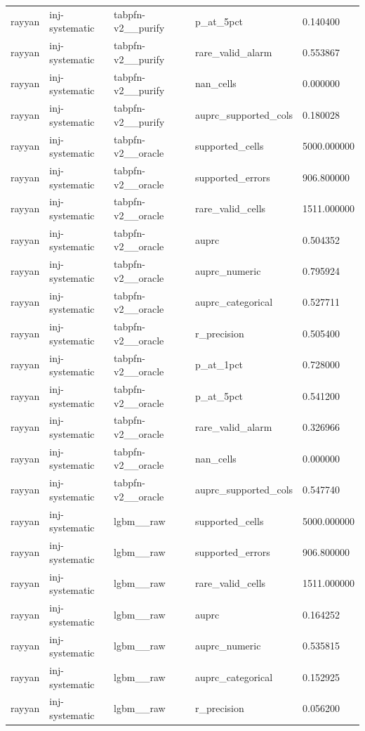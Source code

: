 \begin{tabular}{lllll}
rayyan & inj-systematic & tabpfn-v2\_\_purify & p\_at\_5pct & 0.140400 \\
rayyan & inj-systematic & tabpfn-v2\_\_purify & rare\_valid\_alarm & 0.553867 \\
rayyan & inj-systematic & tabpfn-v2\_\_purify & nan\_cells & 0.000000 \\
rayyan & inj-systematic & tabpfn-v2\_\_purify & auprc\_supported\_cols & 0.180028 \\
rayyan & inj-systematic & tabpfn-v2\_\_oracle & supported\_cells & 5000.000000 \\
rayyan & inj-systematic & tabpfn-v2\_\_oracle & supported\_errors & 906.800000 \\
rayyan & inj-systematic & tabpfn-v2\_\_oracle & rare\_valid\_cells & 1511.000000 \\
rayyan & inj-systematic & tabpfn-v2\_\_oracle & auprc & 0.504352 \\
rayyan & inj-systematic & tabpfn-v2\_\_oracle & auprc\_numeric & 0.795924 \\
rayyan & inj-systematic & tabpfn-v2\_\_oracle & auprc\_categorical & 0.527711 \\
rayyan & inj-systematic & tabpfn-v2\_\_oracle & r\_precision & 0.505400 \\
rayyan & inj-systematic & tabpfn-v2\_\_oracle & p\_at\_1pct & 0.728000 \\
rayyan & inj-systematic & tabpfn-v2\_\_oracle & p\_at\_5pct & 0.541200 \\
rayyan & inj-systematic & tabpfn-v2\_\_oracle & rare\_valid\_alarm & 0.326966 \\
rayyan & inj-systematic & tabpfn-v2\_\_oracle & nan\_cells & 0.000000 \\
rayyan & inj-systematic & tabpfn-v2\_\_oracle & auprc\_supported\_cols & 0.547740 \\
rayyan & inj-systematic & lgbm\_\_raw & supported\_cells & 5000.000000 \\
rayyan & inj-systematic & lgbm\_\_raw & supported\_errors & 906.800000 \\
rayyan & inj-systematic & lgbm\_\_raw & rare\_valid\_cells & 1511.000000 \\
rayyan & inj-systematic & lgbm\_\_raw & auprc & 0.164252 \\
rayyan & inj-systematic & lgbm\_\_raw & auprc\_numeric & 0.535815 \\
rayyan & inj-systematic & lgbm\_\_raw & auprc\_categorical & 0.152925 \\
rayyan & inj-systematic & lgbm\_\_raw & r\_precision & 0.056200 \\

\end{tabular}
